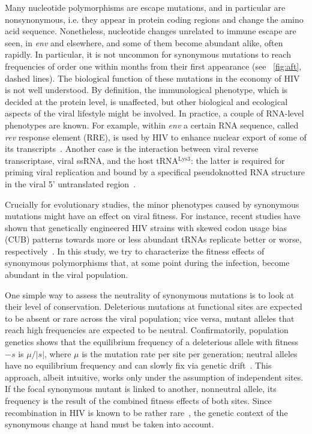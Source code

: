 \documentclass[12pt,a4paper,notitlepage,onecolumn]{article}
\newcommand{\mut}{\mu}
\newcommand{\env}{\textit{env}}
\newcommand{\rev}{\textit{rev}}
\begin{document}
Many nucleotide polymorphisms are escape mutations, and in particular are
nonsynonymous, i.e. they appear in protein coding regions and change the amino
acid sequence. Nonetheless, nucleotide changes unrelated to immune escape are
seen, in \env{} and elsewhere, and some of them become abundant alike, often
rapidly. In particular, it is not uncommon for synonymous mutations to reach
frequencies of order one within months from their first appearance (see
\figurename~\ref{fig:aft}, dashed lines). The biological function of these
mutations in the economy of HIV is not well understood. By definition, the
immunological phenotype, which is decided at the protein level, is unaffected,
but other biological and ecological aspects of the viral lifestyle might be
involved. In practice, a couple of RNA-level phenotypes are
known. For example, within \env{} a certain RNA sequence, called \rev{}
response element (RRE), is used by HIV to enhance nuclear export of some of its
transcripts~\citep{fernandes_hiv-1_2012}. Another case is the interaction
between viral reverse transcriptase, viral ssRNA, and the host
tRNA$^\text{Lys3}$: the latter is required for priming viral replication and
bound by a specifical pseudoknotted RNA structure in the viral 5' untranslated
region~\citep{barat_interaction_1991, paillart_vitro_2002}.

Crucially for evolutionary studies, the minor phenotypes caused by synonymous
mutations might have an effect on viral fitness. For instance, recent studies
have shown that genetically engineered HIV strains with skewed codon usage bias
(CUB) patterns towards more or less abundant tRNAs replicate better or worse,
respectively~\citep{ngumbela_quantitative_2008, li_codon-usage-based_2012}.
In this study, we try to characterize the fitness effects of synonymous
polymorphisms that, at some point during the infection, become abundant in the
viral population.

One simple way to assess the neutrality of synonymous mutations is to look at
their level of conservation. Deleterious mutations at functional sites are
expected to be absent or rare across the viral population; vice versa, mutant
alleles that reach high frequencies are expected to be neutral. Confirmatorily,
population genetics shows that the equilibrium frequency of a deleterious allele
with fitness $-s$ is $\mut / |s|$, where $\mut$ is the mutation rate per site
per generation; neutral alleles have no equilibrium frequency and can slowly fix
via genetic drift~\citep{ewens_mathematical_2004}. This approach, albeit
intuitive, works only under the assumption of independent sites. If the focal
synonymous mutant is linked to another, nonneutral allele, its frequency is the
result of the combined fitness effects of both sites. Since recombination in HIV
is known to be rather rare~\citep{neher_recombination_2010,
batorsky_estimate_2011}, the genetic context of the synonymous change at hand
must be taken into account.
\end{document}
